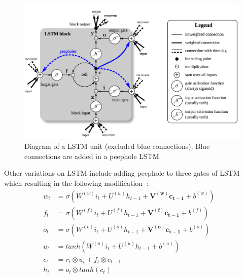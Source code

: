 \begin{figure}[H]
    \centering
    \includegraphics[scale=0.4]{figure/lstm}
    \caption[LSTM unit]{Diagram of a LSTM unit (excluded blue connections). Blue connections are added in a peephole LSTM.~\cite{lstm-search}}
    \label{fig:lstm}
\end{figure}


Other variations on LSTM include adding peephole to three gates of LSTM~\cite{peephole} which resulting in the following modification~\cite{colah-lsmt}:
\begin{align}
    w_t &= \sigma(W^{(w)}i_t + U^{(w)}h_{t-1} + \bm{V^{(w)}c_{t-1}} + b^{(w)}) &\\ 
      f_t &= \sigma(W^{(f)}i_t + U^{(f)}h_{t-1} + \bm{V^{(f)}c_{t-1}} + b^{(f)}) &\\ 
      o_t &= \sigma(W^{(o)}i_t + U^{(o)}h_{t-1} + \bm{V^{(o)}c_{t-1}} + b^{(o)}) &\\ 
      u_t &= tanh(W^{(u)}i_t + U^{(u)}h_{t-1} + b^{(u)}) &\\ 
      c_t &= r_t \otimes u_t + f_t \otimes c_{t-1} &\\ 
      h_t &= o_t \otimes tanh(c_t) & 
\end{align} 

